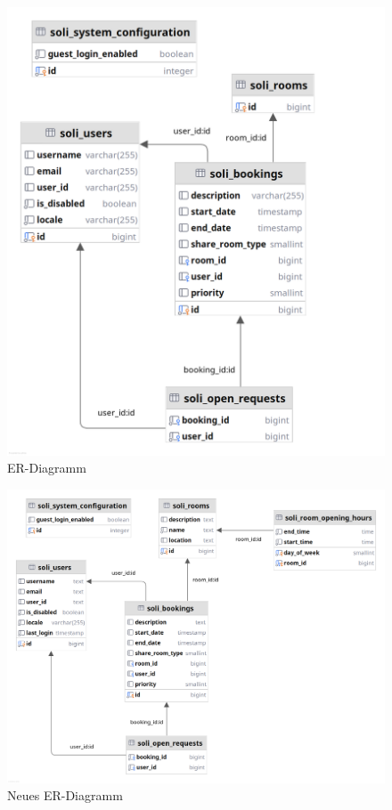 \begin{figure}[ht]
    \centering
    \includegraphics[width=\textwidth]{figures/database_old}
    \caption{ER-Diagramm}
    \label{fig:er_diagramm}
\end{figure}

\begin{figure}[ht]
    \centering
    \includegraphics[width=\textwidth]{figures/database_new}
    \caption{Neues ER-Diagramm}
    \label{fig:er_diagramm_new}
\end{figure}
